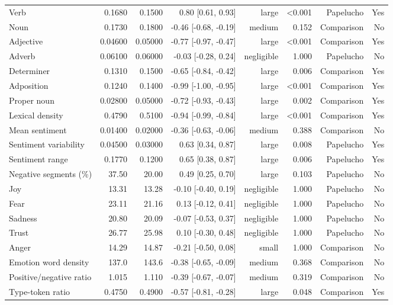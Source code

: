 \begin{table}[htbp]
\begin{tabular}{lrrrrrrr}
Verb & 0.1680 & 0.1500 & 0.80 [0.61, 0.93] & large & <0.001 & Papelucho & Yes \\
Noun & 0.1730 & 0.1800 & -0.46 [-0.68, -0.19] & medium & 0.152 & Comparison & No \\
Adjective & 0.04600 & 0.05000 & -0.77 [-0.97, -0.47] & large & <0.001 & Comparison & Yes \\
Adverb & 0.06100 & 0.06000 & -0.03 [-0.28, 0.24] & negligible & 1.000 & Papelucho & No \\
Determiner & 0.1310 & 0.1500 & -0.65 [-0.84, -0.42] & large & 0.006 & Comparison & Yes \\
Adposition & 0.1240 & 0.1400 & -0.99 [-1.00, -0.95] & large & <0.001 & Comparison & Yes \\
Proper noun & 0.02800 & 0.05000 & -0.72 [-0.93, -0.43] & large & 0.002 & Comparison & Yes \\
Lexical density & 0.4790 & 0.5100 & -0.94 [-0.99, -0.84] & large & <0.001 & Comparison & Yes \\
Mean sentiment & 0.01400 & 0.02000 & -0.36 [-0.63, -0.06] & medium & 0.388 & Comparison & No \\
Sentiment variability & 0.04500 & 0.03000 & 0.63 [0.34, 0.87] & large & 0.008 & Papelucho & Yes \\
Sentiment range & 0.1770 & 0.1200 & 0.65 [0.38, 0.87] & large & 0.006 & Papelucho & Yes \\
Negative segments (\%) & 37.50 & 20.00 & 0.49 [0.25, 0.70] & large & 0.103 & Papelucho & No \\
Joy & 13.31 & 13.28 & -0.10 [-0.40, 0.19] & negligible & 1.000 & Papelucho & No \\
Fear & 23.11 & 21.16 & 0.13 [-0.12, 0.41] & negligible & 1.000 & Papelucho & No \\
Sadness & 20.80 & 20.09 & -0.07 [-0.53, 0.37] & negligible & 1.000 & Papelucho & No \\
Trust & 26.77 & 25.98 & 0.10 [-0.30, 0.48] & negligible & 1.000 & Papelucho & No \\
Anger & 14.29 & 14.87 & -0.21 [-0.50, 0.08] & small & 1.000 & Comparison & No \\
Emotion word density & 137.0 & 143.6 & -0.38 [-0.65, -0.09] & medium & 0.368 & Comparison & No \\
Positive/negative ratio & 1.015 & 1.110 & -0.39 [-0.67, -0.07] & medium & 0.319 & Comparison & No \\
Type-token ratio & 0.4750 & 0.4900 & -0.57 [-0.81, -0.28] & large & 0.048 & Comparison & Yes \\

\end{tabular}
\end{table}
